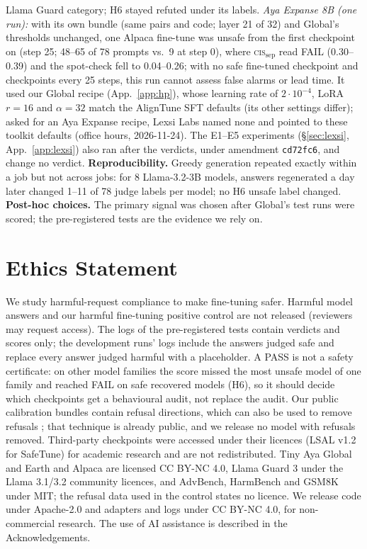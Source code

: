 \documentclass[11pt]{article}
\newcommand{\cissep}{\textsc{cis}$_{\text{sep}}$}
\begin{document}
Llama Guard category; H6 stayed refuted under its labels. \emph{Aya Expanse 8B \citep{dang2024ayaexpanse} (one run):} with its own bundle
(same pairs and code; layer 21 of 32) and Global's thresholds unchanged, one Alpaca fine-tune was unsafe from the first
checkpoint on (step 25; 48--65 of 78 prompts vs.\ 9 at step 0), where \cissep{} read FAIL (0.30--0.39) and the
spot-check fell to 0.04--0.26; with no safe fine-tuned checkpoint and checkpoints every 25 steps, this run cannot
assess false alarms or lead time. It used our Global recipe (App.~\ref{app:hp}), whose learning rate of
$2\cdot10^{-4}$, LoRA $r=16$ and $\alpha=32$ match the AlignTune SFT defaults \citep{lexsi2026aligntune} (its other
settings differ); asked for an Aya Expanse recipe, Lexsi Labs named none and pointed to these toolkit defaults
(office hours, 2026-11-24). The E1--E5 experiments (\S\ref{sec:lexsi}, App.~\ref{app:lexsi}) also ran after the verdicts, under amendment
\texttt{cd72fc6}, and change no verdict. \textbf{Reproducibility.} Greedy generation repeated exactly within a job but not
across jobs: for 8 Llama-3.2-3B models, answers regenerated a day later changed 1--11 of 78 judge labels per model; no
H6 unsafe label changed. \textbf{Post-hoc choices.} The primary signal was chosen after Global's test runs were scored; the
pre-registered tests are the evidence we rely on.

\section*{Ethics Statement}

We study harmful-request compliance to make fine-tuning safer. Harmful model answers and our harmful fine-tuning
positive control are not released (reviewers may request access). The logs of the pre-registered tests contain
verdicts and scores only; the development runs' logs include the answers judged safe and replace every answer judged
harmful with a placeholder. A PASS is not a safety certificate: on other model families the score missed the most
unsafe model of one family and reached FAIL on safe recovered models (H6), so it should decide which checkpoints get a
behavioural audit, not replace the audit. Our public calibration bundles contain refusal directions, which can also be
used to remove refusals \citep{arditi2024refusal}; that technique is already public, and we release no model with
refusals removed. Third-party checkpoints were
accessed under their licences (LSAL v1.2 for SafeTune) for academic research and are not redistributed. Tiny Aya
Global and Earth and Alpaca are licensed CC BY-NC 4.0, Llama Guard 3 under the Llama 3.1/3.2 community licences, and
AdvBench, HarmBench and GSM8K under MIT; the refusal data used in the control states no licence. We release code under
Apache-2.0 and adapters and logs under CC BY-NC 4.0, for non-commercial research. The use of AI assistance is described in the Acknowledgements.
\end{document}
